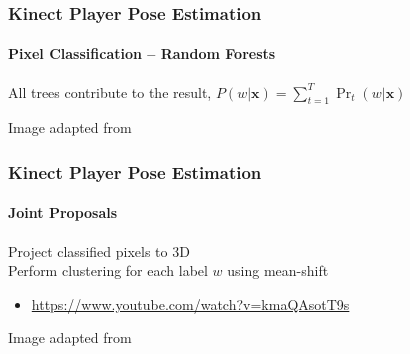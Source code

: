 \documentclass[xetex,professionalfont]{beamer}
\renewcommand{\vec}[1]{\ensuremath{\mathbf{#1}}}
\newcommand{\vx}{\vec{x}}
\begin{document}

\begin{frame}
\frametitle{Kinect Player Pose Estimation}
\framesubtitle{Pixel Classification -- Random Forests}

All trees contribute to the result, $P(w|\vx)=\sum_{t=1}^T \Pr_t(w|\vx)$

\bigskip
\begin{center}
    {\centering Image adapted from \cite{shotton2011}}
\end{center}

\end{frame}


\begin{frame}
\frametitle{Kinect Player Pose Estimation}
\framesubtitle{Joint Proposals}

Project classified pixels to 3D\\\medskip
Perform clustering for each label $w$ using mean-shift %
\begin{itemize}
    \item \url{https://www.youtube.com/watch?v=kmaQAsotT9s}
\end{itemize}

\bigskip
\begin{center}
    {\centering Image adapted from \cite{shotton2011}}
\end{center}

\end{frame}
\end{document}
